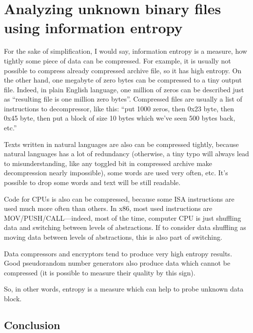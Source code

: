\section[Analyzing using information entropy]{Analyzing unknown binary files using information entropy}
\label{entropy}

For the sake of simplification, I would say, information entropy is a measure, how tightly some piece of data can be compressed.
For example, it is usually not possible to compress already compressed archive file, so it has high entropy.
On the other hand, one megabyte of zero bytes can be compressed to a tiny output file.
Indeed, in plain English language, one million of zeros can be described just as ``resulting file is one million zero bytes''.
Compressed files are usually a list of instructions to decompressor, like this: ``put 1000 zeros, then 0x23 byte, then 0x45 byte, then put a block of size 10 bytes which we've seen 500 bytes back, etc.''

Texts written in natural languages are also can be compressed tightly, 
because natural languages has a lot of redundancy
(otherwise, a tiny typo will always lead to misunderstanding, 
like any toggled bit in compressed archive make decompression nearly impossible), 
some words are used very often, etc.
It's possible to drop some words and text will be still readable.

Code for CPUs is also can be compressed, because some ISA instructions are used much more often than others.
In x86, most used instructions are MOV/PUSH/CALL---indeed, most of the time, computer CPU is just shuffling data and switching between
levels of abstractions.
If to consider data shuffling as moving data between levels of abstractions, this is also part of switching.

Data compressors and encryptors tend to produce very high entropy results.
Good pseudorandom number generators also produce data which cannot be compressed 
(it is possible to measure their quality by this sign).

So, in other words, entropy is a measure which can help to probe unknown data block.



\subsection{Conclusion}

